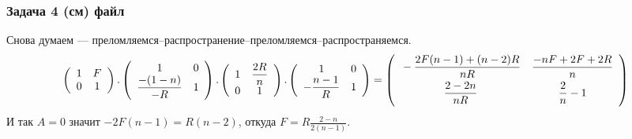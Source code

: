 \subsubsection*{Задача 4 (см) файл}
Снова думаем --- преломляемся--распространение--преломляемся--распространяемся.
\begin{equation*}
	\left(
\begin{array}{cc}
 1 & F \\
 0 & 1 \\
\end{array}
\right).\left(
\begin{array}{cc}
 1 & 0 \\
 \dfrac{-(1-n)}{-R} & 1 \\
\end{array}
\right).\left(
\begin{array}{cc}
 1 & \dfrac{2 R}{n} \\
 0 & 1 \\
\end{array}
\right).\left(
\begin{array}{cc}
 1 & 0 \\
 -\dfrac{n-1}{R} & 1 \\
\end{array}
\right)
=
\left(
\begin{array}{cc}
\vphantom{\bigg|}
 -\dfrac{2 F (n-1)+(n-2) R}{n R} & \dfrac{-n F+2 F+2 R}{n} \\
 \vphantom{\bigg|}
 \dfrac{2-2 n}{n R} & \dfrac{2}{n}-1 \\
\end{array}
\right)
\end{equation*}
И так $A = 0$ значит $- 2 F (n-1) = R (n-2)$, откуда $F = R \frac{2-n}{2 (n-1)}$.

